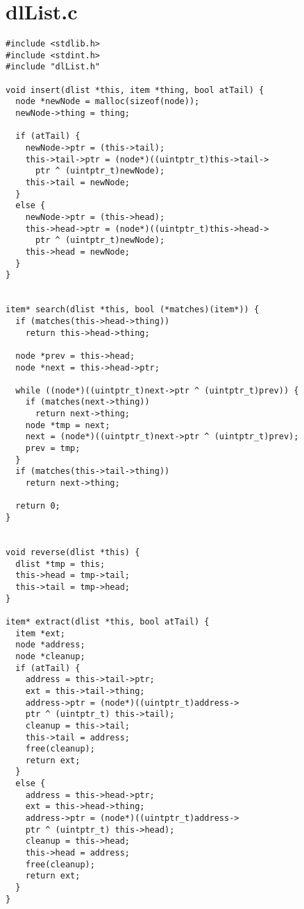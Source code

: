 \documentclass[a4paper,12pt]{article}
\begin{document}
\section*{dlList.c}
\begin{lstlisting}
#include <stdlib.h>
#include <stdint.h>
#include "dlList.h"

void insert(dlist *this, item *thing, bool atTail) {
  node *newNode = malloc(sizeof(node));
  newNode->thing = thing;

  if (atTail) {
    newNode->ptr = (this->tail);
    this->tail->ptr = (node*)((uintptr_t)this->tail->
      ptr ^ (uintptr_t)newNode);
    this->tail = newNode;
  }
  else {
    newNode->ptr = (this->head);
    this->head->ptr = (node*)((uintptr_t)this->head->
      ptr ^ (uintptr_t)newNode);
    this->head = newNode;
  }
}


item* search(dlist *this, bool (*matches)(item*)) {
  if (matches(this->head->thing))
    return this->head->thing;

  node *prev = this->head;
  node *next = this->head->ptr;

  while ((node*)((uintptr_t)next->ptr ^ (uintptr_t)prev)) {
    if (matches(next->thing))
      return next->thing;
    node *tmp = next;
    next = (node*)((uintptr_t)next->ptr ^ (uintptr_t)prev);
    prev = tmp;
  }
  if (matches(this->tail->thing))
    return next->thing;

  return 0;
}


void reverse(dlist *this) {
  dlist *tmp = this;
  this->head = tmp->tail;
  this->tail = tmp->head;
}

item* extract(dlist *this, bool atTail) {
  item *ext;
  node *address;
  node *cleanup;
  if (atTail) {
    address = this->tail->ptr;
    ext = this->tail->thing;
    address->ptr = (node*)((uintptr_t)address->
    ptr ^ (uintptr_t) this->tail);
    cleanup = this->tail;
    this->tail = address;
    free(cleanup);
    return ext;
  }
  else {
    address = this->head->ptr;
    ext = this->head->thing;
    address->ptr = (node*)((uintptr_t)address->
    ptr ^ (uintptr_t) this->head);
    cleanup = this->head;
    this->head = address;
    free(cleanup);
    return ext;
  }
}
\end{lstlisting}
\newpage
\end{document}
